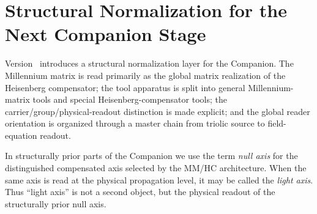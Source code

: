 \section{Structural Normalization for the Next Companion Stage}
\label{sec:structural-normalization}

\begin{remark}
Version \docversion\ introduces a structural normalization layer for the
Companion. The Millennium matrix is read primarily as the global matrix
realization of the Heisenberg compensator; the tool apparatus is split into
general Millennium-matrix tools and special Heisenberg-compensator tools; the
carrier/group/physical-readout distinction is made explicit; and the global
reader orientation is organized through a master chain from triolic source to
field-equation readout.
\end{remark}

\begin{remark}
In structurally prior parts of the Companion we use the term \emph{null axis}
for the distinguished compensated axis selected by the MM/HC architecture.
When the same axis is read at the physical propagation level, it may be called
the \emph{light axis}. Thus ``light axis'' is not a second object, but the
physical readout of the structurally prior null axis.
\end{remark}

